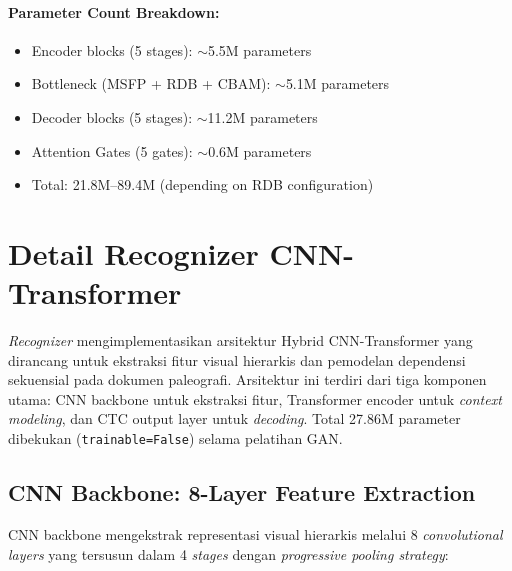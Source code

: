 \paragraph{Parameter Count Breakdown:}
\begin{itemize}[nosep]
    \item Encoder blocks (5 stages): $\sim$5.5M parameters
    \item Bottleneck (MSFP + RDB + CBAM): $\sim$5.1M parameters
    \item Decoder blocks (5 stages): $\sim$11.2M parameters
    \item Attention Gates (5 gates): $\sim$0.6M parameters
    \item Total: 21.8M--89.4M (depending on RDB configuration)
\end{itemize}


\section{Detail Recognizer CNN-Transformer}
\label{appendix:recognizer-details}

\textit{Recognizer} mengimplementasikan arsitektur Hybrid CNN-Transformer yang dirancang untuk ekstraksi fitur visual hierarkis dan pemodelan dependensi sekuensial pada dokumen paleografi. Arsitektur ini terdiri dari tiga komponen utama: CNN backbone untuk ekstraksi fitur, Transformer encoder untuk \textit{context modeling}, dan CTC output layer untuk \textit{decoding}. Total 27.86M parameter dibekukan (\texttt{trainable=False}) selama pelatihan GAN.


\subsection{CNN Backbone: 8-Layer Feature Extraction}
\label{appendix:recognizer-cnn}

CNN backbone mengekstrak representasi visual hierarkis melalui 8 \textit{convolutional layers} yang tersusun dalam 4 \textit{stages} dengan \textit{progressive pooling strategy}:

